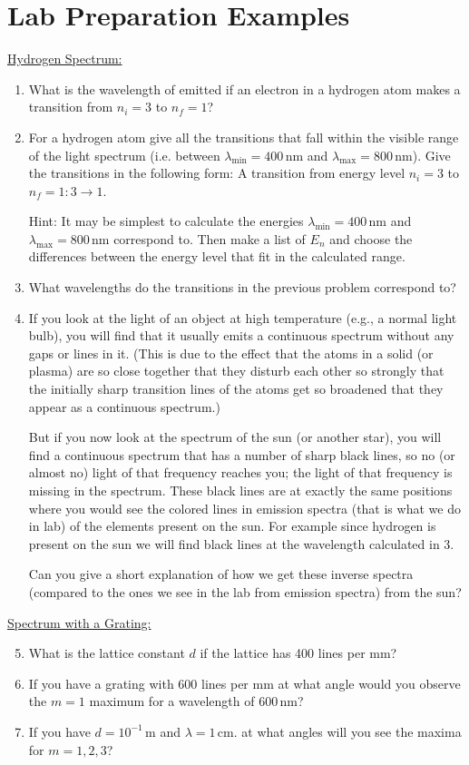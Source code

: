 \section{Lab Preparation Examples}
\underline{Hydrogen Spectrum:}
\begin{enumerate}
\item What is the wavelength of emitted if an electron in a hydrogen atom makes a transition from $n_i=3$ to $n_f=1$?

\item For a hydrogen atom give all the transitions that fall within the visible range of the light spectrum (i.e. between $\lambda_{\mathrm{min}}=400\,\mathrm{nm}$ and $\lambda_{\mathrm{max}}=800\,\mathrm{nm}$). Give the transitions in the following form:
A transition from energy level $n_i=3$ to $n_f=1:3 \rightarrow 1$.\myskip

Hint: It may be simplest to calculate the energies $\lambda_{\mathrm{min}}=400\,\mathrm{nm}$ and $\lambda_{\mathrm{max}}=800\,\mathrm{nm}$ correspond to. Then make a list of $E_{n}$ and choose the differences between the energy level that fit in the calculated range.

\item What wavelengths do the transitions in the previous problem correspond to?
\item If you look at the light of an object at high temperature (e.g., a normal light bulb), you will find that it usually emits a continuous spectrum without any gaps or lines in it. (This is due to the effect that the atoms in a solid (or plasma) are so close together that they disturb each other so strongly that the initially sharp transition lines of the atoms get so broadened that they appear as a continuous spectrum.)\myskip

But if you now look at the spectrum of the sun (or another star), you will find a continuous spectrum that has a number of sharp black lines, so no (or almost no) light of that frequency reaches you; the light of that frequency is missing in the spectrum. These black lines are at exactly the same positions where you would see the colored lines in emission spectra (that is what we do in lab) of the elements present on the sun. For example since hydrogen is present on the sun we will find black lines at the
wavelength calculated in 3.\myskip

Can you give a short explanation of how we get these inverse spectra (compared to the ones we see in the lab from emission spectra) from the sun?
\end{enumerate}

\noindent\underline{Spectrum with a Grating:}
\begin{enumerate}\setcounter{enumi}{4}
\item What is the lattice constant $d$ if the lattice has 400 lines per mm?
\item If you have a grating with 600 lines per mm at what angle would you observe the $m=1$ maximum for a wavelength of $600\,\mathrm{nm}$?
\item If you have $d = 10^{-1}\, \mathrm{m}$ and $\lambda = 1\,\mathrm{cm}$. at what angles will you see the maxima for $m=1, 2, 3$?
\end{enumerate}
